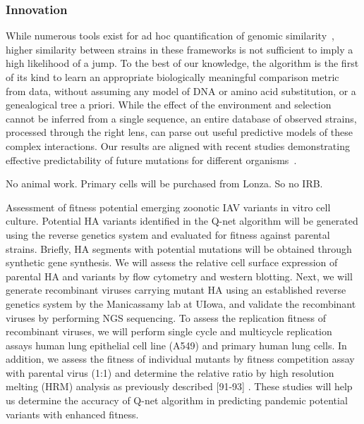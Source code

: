 \documentclass[onecolumn, compsoc,12pt]{IEEEtran}
\begin{document}
\subsubsection*{Innovation} %
While numerous tools exist for ad hoc quantification of genomic similarity~\cite{posada1998modeltest,goldberger2005genomic,huelsenbeck1997phylogeny,neher2014predicting,VanderMeer2010,Smith2009}, higher similarity between strains in  these frameworks is not sufficient to imply a high likelihood of a jump. To the best of our knowledge, the \enet algorithm is  the first of its kind to learn an appropriate biologically meaningful comparison metric from data, without assuming any model of DNA or amino acid substitution, or a genealogical tree a priori. While the effect of the environment and selection cannot be inferred from a single sequence, an entire database of observed strains, processed through the right lens, can parse out useful predictive models of these complex interactions. Our results are  aligned with recent studies demonstrating effective  predictability of  future mutations  for different organisms~\cite{mollentze2021identifying,maher2021predicting}.


No animal work. Primary cells will be purchased from Lonza. So no IRB.


Assessment of fitness potential emerging zoonotic IAV variants in vitro cell culture.
Potential HA variants identified in the Q-net algorithm will be generated using the reverse
genetics system and evaluated for fitness against parental strains. Briefly, HA segments with
potential mutations will be obtained through synthetic gene synthesis. We will assess the
relative cell surface expression of parental HA and variants by flow cytometry and western
blotting. Next, we will generate recombinant viruses carrying mutant HA using an established
reverse genetics system by the Manicassamy lab at UIowa, and validate the recombinant
viruses by performing NGS sequencing. To assess the replication fitness of recombinant
viruses, we will perform single cycle and multicycle replication assays human lung epithelial
cell line (A549) and primary human lung cells. In addition, we assess the fitness of individual
mutants by fitness competition assay with parental virus (1:1) and determine the relative ratio
by high resolution melting (HRM) analysis as previously described [91-93] . These studies will
help us determine the accuracy of Q-net algorithm in predicting pandemic potential variants
with enhanced fitness.
\end{document}
